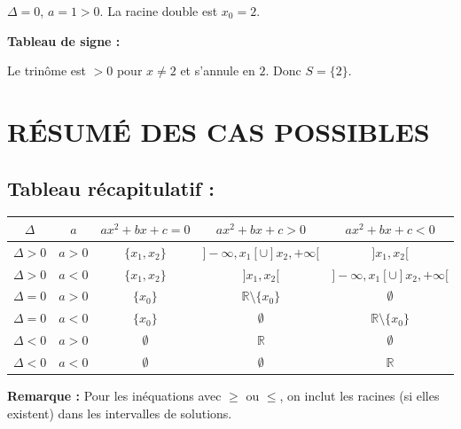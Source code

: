 \documentclass[12pt,a4paper]{article}
\newcounter{solution}
\begin{document}
\begin{itemize}
\begin{enumerate}[label=\arabic*)]
        $\Delta = 0$, $a = 1 > 0$. La racine double est $x_0 = 2$.
        
        \textbf{Tableau de signe :}
    \begin{center}
    \end{center}
        
        Le trinôme est $> 0$ pour $x \neq 2$ et s'annule en $2$.
        Donc $S = \{2\}$.
    \end{enumerate}
\end{itemize}

\newpage
\section*{\color{myred} RÉSUMÉ DES CAS POSSIBLES}

\subsection*{\color{myred} Tableau récapitulatif :}

\begin{center}
\renewcommand{\arraystretch}{1.5}
\begin{tabular}{|c|c|c|c|c|}
\hline
$\Delta$ & $a$ & $ax^2+bx+c=0$ & $ax^2+bx+c>0$ & $ax^2+bx+c<0$ \\
\hline
$\Delta > 0$ & $a>0$ & $\{x_1, x_2\}$ & $]-\infty, x_1[ \cup ]x_2, +\infty[$ & $]x_1, x_2[$ \\
\hline
$\Delta > 0$ & $a<0$ & $\{x_1, x_2\}$ & $]x_1, x_2[$ & $]-\infty, x_1[ \cup ]x_2, +\infty[$ \\
\hline
$\Delta = 0$ & $a>0$ & $\{x_0\}$ & $\mathbb{R} \setminus \{x_0\}$ & $\emptyset$ \\
\hline
$\Delta = 0$ & $a<0$ & $\{x_0\}$ & $\emptyset$ & $\mathbb{R} \setminus \{x_0\}$ \\
\hline
$\Delta < 0$ & $a>0$ & $\emptyset$ & $\mathbb{R}$ & $\emptyset$ \\
\hline
$\Delta < 0$ & $a<0$ & $\emptyset$ & $\emptyset$ & $\mathbb{R}$ \\
\hline
\end{tabular}
\end{center}

\vspace{1em}
\noindent \textbf{Remarque :} Pour les inéquations avec $\geq$ ou $\leq$, on inclut les racines (si elles existent) dans les intervalles de solutions.
\end{document}
